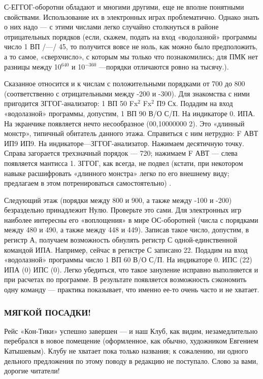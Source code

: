 \documentclass[11pt,a4paper,oneside]{article}
\begin{document}
С-ЕГГОГ-оборотни обладают и многими другими, еще не вполне понятными свойствами. Использование их в электронных играх проблематично. Однако знать о них надо — с этими числами легко случайно столкнуться в районе отрицательных порядков (если, скажем, подать на вход «водолазной» программы число 1 ВП /—/ 45, то получится вовсе не ноль, как можно было предположить, а то самое, «сверхчисло», с которым мы только что познакомились; для ПМК нет разницы между 10$^{640}$ и 10$^{-360}$ —порядки отличаются ровно на тысячу.).

Сказанное относится и к числам с положительными порядками от 700 до 800 (соответственно с отрицательными между -200 и -300). Для знакомства с ними пригодится ЗГГОГ-анализатор: 1 ВП 50 Fx$^{2}$ Fx$^{2}$ П9 Сх. Подадим на вход «водолазной» программы, допустим, 1 ВП 90 В/О С/П. На индикаторе 0. ИПА. На экранчике появляется нечто несообразное (00,10000000 2). Это «длинный монстр», типичный обитатель данного этажа. Справиться с ним нетрудно: F АВТ ИП9 ИП9. На индикаторе—ЗГГОГ-анализатор. Нажимаем десятичную точку. Справа загорается трехзначный порядок — 720; нажимаем F АВТ — слева появляется мантисса 1. ЗГГОГ, как всегда, не подвел (кстати, при некотором навыке расшифровать «длинного монстра» легко по его внешнему виду; предлагаем в этом потренироваться самостоятельно) .

Следующий этаж (порядки между 800 и 900, а также между -100 и -200) безраздельно принадлежит Нулю. Проверьте это сами. Для электронных игр наиболее интересны его «воплощения» в мире ОС-оборотней (числа с порядками между 480 и 490, а также между 448 и 449). Записав такое число, допустим, в регистр А, получаем возможность обнулять регистр С одной-единственной командой ИПА. Например, сейчас в регистре С записано 22. Подадим на вход «водолазной» программы число 1 ВП 60 В/О С/П. На индикаторе 0. ИПС (22) ИПА (0) ИПС (0). Легко убедиться, что такое зануление исправно выполняется и при расчетах по программе. В результате появляется возможность сэкономить одну команду — практика показывает, что именно ее-то очень часто и не хватает.

\subsubsection{МЯГКОЙ ПОСАДКИ!}
Рейс «Кон-Тики» успешно завершен — и наш Клуб, как видим, незамедлительно перебрался в новое помещение (оформленное, как обычно, художником Евгением Катышевым). Клубу не хватает пока только названия; к сожалению, ни одного дельного предложения по этому поводу в редакцию не поступало. Слово за вами, дорогие читатели!
\end{document}

